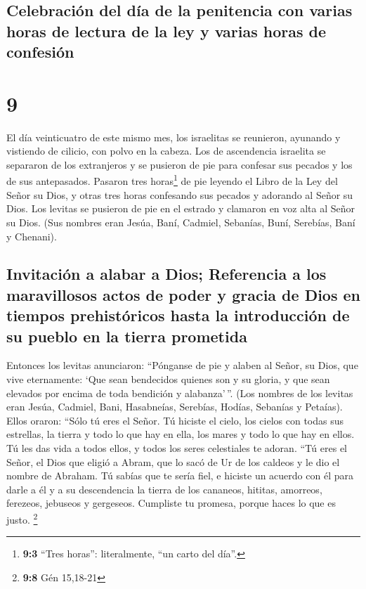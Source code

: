 \hypertarget{celebraciuxf3n-del-duxeda-de-la-penitencia-con-varias-horas-de-lectura-de-la-ley-y-varias-horas-de-confesiuxf3n}{%
\subsection{Celebración del día de la penitencia con varias horas de
lectura de la ley y varias horas de
confesión}\label{celebraciuxf3n-del-duxeda-de-la-penitencia-con-varias-horas-de-lectura-de-la-ley-y-varias-horas-de-confesiuxf3n}}

\hypertarget{section-8}{%
\section{9}\label{section-8}}

 El día veinticuatro de este mismo mes, los israelitas se
reunieron, ayunando y vistiendo de cilicio, con polvo en la cabeza.
 Los de ascendencia israelita se separaron de los
extranjeros y se pusieron de pie para confesar sus pecados y los de sus
antepasados.  Pasaron tres horas\footnote{\textbf{9:3}
  ``Tres horas'': literalmente, ``un carto del día''.} de pie leyendo el
Libro de la Ley del Señor su Dios, y otras tres horas confesando sus
pecados y adorando al Señor su Dios.  Los levitas se
pusieron de pie en el estrado y clamaron en voz alta al Señor su Dios.
(Sus nombres eran Jesúa, Baní, Cadmiel, Sebanías, Buní, Serebías, Baní y
Chenani).

\hypertarget{invitaciuxf3n-a-alabar-a-dios-referencia-a-los-maravillosos-actos-de-poder-y-gracia-de-dios-en-tiempos-prehistuxf3ricos-hasta-la-introducciuxf3n-de-su-pueblo-en-la-tierra-prometida}{%
\subsection{Invitación a alabar a Dios; Referencia a los maravillosos
actos de poder y gracia de Dios en tiempos prehistóricos hasta la
introducción de su pueblo en la tierra
prometida}\label{invitaciuxf3n-a-alabar-a-dios-referencia-a-los-maravillosos-actos-de-poder-y-gracia-de-dios-en-tiempos-prehistuxf3ricos-hasta-la-introducciuxf3n-de-su-pueblo-en-la-tierra-prometida}}

 Entonces los levitas anunciaron: ``Pónganse de pie y
alaben al Señor, su Dios, que vive eternamente: `Que sean bendecidos
quienes son y su gloria, y que sean elevados por encima de toda
bendición y alabanza'\,''. (Los nombres de los levitas eran Jesúa,
Cadmiel, Bani, Hasabneías, Serebías, Hodías, Sebanías y Petaías).
 Ellos oraron: ``Sólo tú eres el Señor. Tú hiciste el
cielo, los cielos con todas sus estrellas, la tierra y todo lo que hay
en ella, los mares y todo lo que hay en ellos. Tú les das vida a todos
ellos, y todos los seres celestiales te adoran.  ``Tú eres
el Señor, el Dios que eligió a Abram, que lo sacó de Ur de los caldeos y
le dio el nombre de Abraham.  Tú sabías que te sería fiel,
e hiciste un acuerdo con él para darle a él y a su descendencia la
tierra de los cananeos, hititas, amorreos, ferezeos, jebuseos y
gergeseos. Cumpliste tu promesa, porque haces lo que es justo.
\footnote{\textbf{9:8} Gén 15,18-21}

